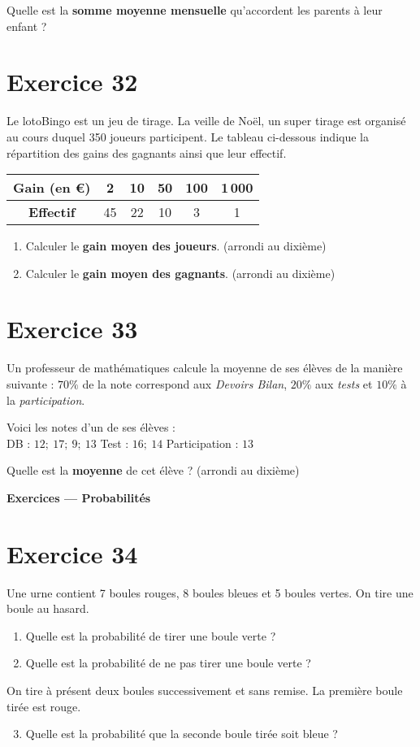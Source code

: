\documentclass[a4paper,11pt]{article}
\begin{document}
\medskip
Quelle est la \textbf{somme moyenne mensuelle} qu’accordent les parents à leur enfant ?

\section*{Exercice 32}
Le loto\textendash Bingo est un jeu de tirage. La veille de Noël, un super tirage est organisé au cours duquel 350 joueurs participent. Le tableau ci-dessous indique la répartition des gains des gagnants ainsi que leur effectif.

\medskip
\renewcommand{\arraystretch}{1.25}
\begin{tabular}{|c|c|c|c|c|c|}
\hline
\textbf{Gain (en \euro)} & 2 & 10 & 50 & 100 & 1\,000\\
\hline
\textbf{Effectif} & 45 & 22 & 10 & 3 & 1\\
\hline
\end{tabular}

\medskip
\begin{enumerate}
  \item Calculer le \textbf{gain moyen des joueurs}. (arrondi au dixième)
  \item Calculer le \textbf{gain moyen des gagnants}. (arrondi au dixième)
\end{enumerate}

\section*{Exercice 33}
Un professeur de mathématiques calcule la moyenne de ses élèves de la manière suivante : \(70\%\) de la note correspond aux \textit{Devoirs Bilan}, \(20\%\) aux \textit{tests} et \(10\%\) à la \textit{participation}.

Voici les notes d’un de ses élèves :\\
\quad DB : \(12;\ 17;\ 9;\ 13\) \qquad
Test : \(16;\ 14\) \qquad
Participation : \(13\)

\medskip
Quelle est la \textbf{moyenne} de cet élève ? (arrondi au dixième)

\bigskip
{\Large \textbf{Exercices — Probabilités}}\par\medskip

\section*{Exercice 34}
Une urne contient 7 boules rouges, 8 boules bleues et 5 boules vertes. On tire une boule au hasard.
\begin{enumerate}
  \item Quelle est la probabilité de tirer une boule verte ?
  \item Quelle est la probabilité de ne pas tirer une boule verte ?
\end{enumerate}
On tire à présent deux boules successivement et sans remise. La première boule tirée est rouge.
\begin{enumerate}\setcounter{enumi}{2}
  \item Quelle est la probabilité que la seconde boule tirée soit bleue ?
\end{enumerate}
\end{document}
